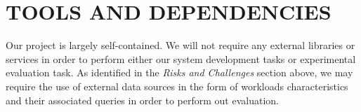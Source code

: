 \documentclass{vldb}
\begin{document}

\section{TOOLS AND DEPENDENCIES}

Our project is largely self-contained. We will not require any external libraries or services in order to perform either our system development tasks or experimental evaluation task. As identified in the \textit{Risks and Challenges} section above, we may require the use of external data sources in the form of workloads characteristics and their associated queries in order to perform out evaluation.


\newcommand{\newblock}{}

\newpage


\end{document}
